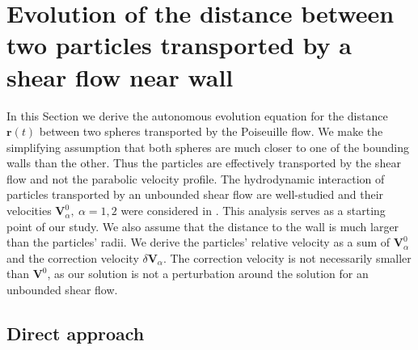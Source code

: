 \section{Evolution of the distance between two particles transported by a shear flow near wall} \label{interpair}

In this Section we derive the autonomous evolution equation for the distance $\bm r(t)$ between two spheres transported by the Poiseuille flow. We make the simplifying assumption that both spheres are much closer to one of the bounding walls than the other. Thus the particles are effectively transported by the shear flow and not the parabolic velocity profile. The hydrodynamic interaction of particles transported by an unbounded shear flow are well-studied and their velocities
$\bm V^0_{\alpha},\ \alpha=1,2$ were considered in \cite{batchelor_green_1972}. This analysis serves as a starting point of our study. We also assume that the distance to the wall is much larger than the particles' radii. We derive the particles' relative velocity as a sum of $\bm V^0_{\alpha}$ and the correction velocity $\delta \bm V_{\alpha}$. The correction velocity is not necessarily smaller than $\bm V^0$, as our solution is not a perturbation around the solution for an unbounded shear flow.


\subsection{Direct approach} \label{direct}

